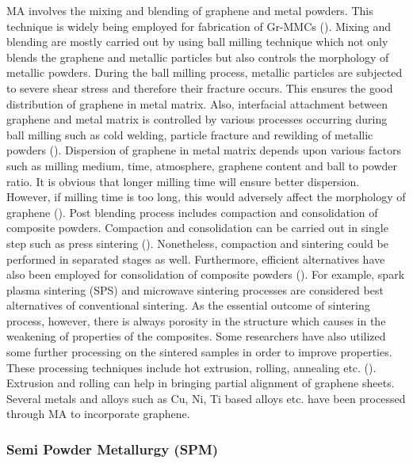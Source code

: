 MA involves the mixing and blending of graphene and metal powders. This technique is widely being employed for fabrication of Gr-MMCs (\cite{kim2014multi, dutkiewicz2015microstructure, borkar2015excellent, yalccin2019enhancement, salvo2019enhanced}). Mixing and blending are mostly carried out by using ball milling technique which not only blends the graphene and metallic particles but also controls the morphology of metallic powders. During the ball milling process, metallic particles are subjected to severe shear stress and therefore their fracture occurs. This ensures the good distribution of graphene in metal matrix. Also, interfacial attachment between graphene and metal matrix is controlled by various processes occurring during ball milling such as cold welding, particle fracture and rewilding of metallic powders (\cite{chu2014enhanced}). Dispersion of graphene in metal matrix depends upon various factors such as milling medium, time, atmosphere, graphene content and ball to powder ratio. It is obvious that longer milling time will ensure better dispersion. However, if milling time is too long, this would adversely affect the morphology of graphene (\cite{perez2014microstructural, yue2017effect}). Post blending process includes compaction and consolidation of composite powders. Compaction and consolidation can be carried out in single step such as press sintering (\cite{perez2014microstructural}). Nonetheless, compaction and sintering could be performed in separated stages as well. Furthermore, efficient alternatives have also been employed for consolidation of composite powders (\cite{borkar2015excellent}). For example, spark plasma sintering (SPS) and microwave sintering processes are considered best alternatives of conventional sintering. As the essential outcome of sintering process, however, there is always porosity in the structure which causes in the weakening of properties of the composites. Some researchers have also utilized some further processing on the sintered samples in order to improve properties. These processing techniques include hot extrusion, rolling, annealing etc. (\cite{shin2015strengthening}). Extrusion and rolling can help in bringing partial alignment of graphene sheets. Several metals and alloys such as Cu, Ni, Ti based alloys etc. have been processed through MA to incorporate graphene.

\subsubsection{Semi Powder Metallurgy (SPM)}

